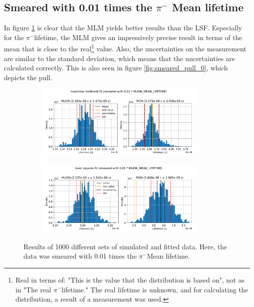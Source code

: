 \documentclass[11pt, a4paper, oneside]{book}
\newcommand\DoublePlotwidth{0.9}
\newcommand{\pion}{$\pi^{-}$}
\begin{document}
\FloatBarrier
\subsection{Smeared with 0.01 times the \texorpdfstring{\pion}{pion} Mean lifetime}

In figure \ref{fig:results_smeared_0} is clear that the MLM yields better results than the LSF. Especially for the \pion lifetime, the MLM gives an impressively precise result in terms of the mean that is close to the real\footnote{Real in terms of: "This is the value that the distribution is based on", not as in "The real \pion lifetime." The real lifetime is unknown, and for calculating the distribution, a result of a measurement was used.} value. Also, the uncertainties on the measurement are similar to the standard deviation, which means that the uncertainties are calculated correctly. This is also seen in figure \ref{fig:smeared_pull_0}, which depicts the pull.

\begin{figure}[h]
\begin{subfigure}{\textwidth}
  \centering
  \includegraphics[width=\DoublePlotwidth\textwidth]{images/4b_hist_0_likelihood.pdf}
\end{subfigure}

\begin{subfigure}{\textwidth}
  \centering
  \includegraphics[width=\DoublePlotwidth\textwidth]{images/4b_hist_0_squares.pdf}
\end{subfigure}
\caption{Results of 1000 different sets of simulated and fitted data. Here, the data was smeared with 0.01 times the \pion Mean lifetime.}
\label{fig:results_smeared_0}
\end{figure}
\end{document}
